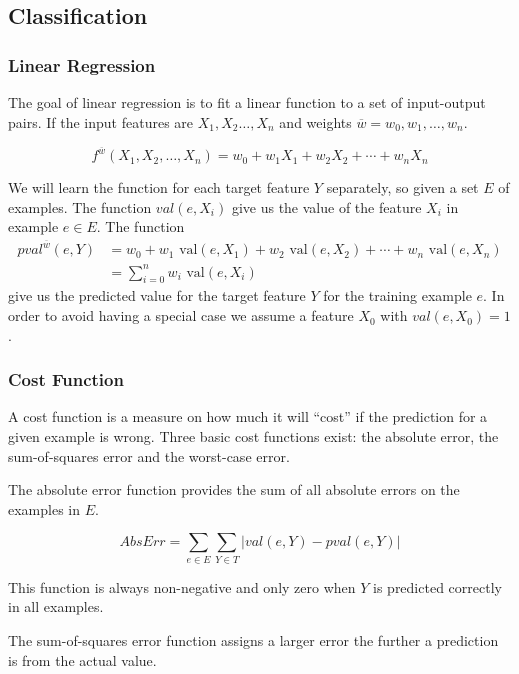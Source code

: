 \subsection{Classification}\label{sec:classification}



\subsubsection{Linear Regression}\label{sec:linreg}
The goal of linear regression is to fit a linear function to a set of input-output pairs. 
If the input features are $X_1,X_2 \dots, X_n$ and weights $\overline{w} = w_0, w_1, \dots, w_n$.

\[f^{\overline{w}}(X_1,X_2, \dots, X_n) = w_0 + w_1 X_1 + w_2 X_2 + \cdots + w_n X_n \]

We will learn the function for each target feature $Y$ separately, so given a set $E$ of examples.
The function $val(e,X_i)$ give us the value of the feature $X_i$ in example $e \in E$. The function 
\begin{align*}
pval^{\overline{w}}(e,Y) &= w_0 + w_1 \text{ val}(e,X_1) + w_2 \text{ val}(e,X_2) + \cdots + w_n \text{ val}(e,X_n) \\
&= \sum^n_{i=0} w_i \text{ val}(e,X_i)
\end{align*}
give us the predicted value for the target feature $Y$ for the training example $e$.
In order to avoid having a special case we assume a feature $X_0$ with $val(e,X_0)=1$.~\cite[p. 304]{AI2010}


\subsubsection{Cost Function}\label{sec:costfun}
A cost function is a measure on how much it will ``cost'' if the prediction for a given example is wrong.
Three basic cost functions exist: the absolute error, the sum-of-squares error and 
the worst-case error.

The absolute error function provides the sum of all absolute errors on the examples in $E$.

\[AbsErr = \sum_{e \in E}\sum_{Y \in T} |val(e,Y) - pval(e,Y)|\]

This function is always non-negative and only zero when $Y$ is predicted correctly in all examples. 

The sum-of-squares error function assigns a larger error the further a prediction is from the actual value.

